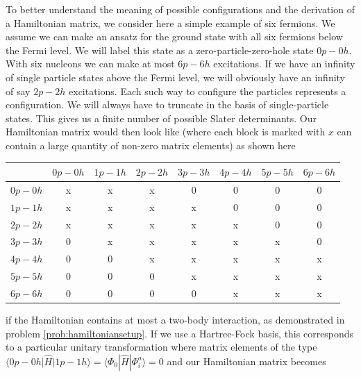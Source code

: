To better understand the meaning of possible configurations and the derivation of a Hamiltonian matrix, we consider here a simple example
of six fermions. We assume we can make an ansatz for the ground state with all six fermions below the Fermi level. We will label this state as a zero-particle-zero-hole state $0p-0h$. With six nucleons we can make 
at most $6p-6h$ excitations. If we have an infinity of single particle states above the Fermi level, we will obviously have an infinity of say $2p-2h$ excitations. Each such way to configure the particles represents  a configuration. We will always have to truncate in the basis of single-particle states.
This gives us a finite number of possible Slater determinants. Our Hamiltonian matrix would then look like (where each block is marked with $x$ can contain a large quantity of non-zero matrix elements) as shown here
\begin{table}
\begin{center}
\begin{tabular}{cccccccc}
\hline
\multicolumn{1}{c}{  } & \multicolumn{1}{c}{ $0p-0h$ } & \multicolumn{1}{c}{ $1p-1h$ } & \multicolumn{1}{c}{ $2p-2h$ } & \multicolumn{1}{c}{ $3p-3h$ } & \multicolumn{1}{c}{ $4p-4h$ } & \multicolumn{1}{c}{ $5p-5h$ } & \multicolumn{1}{c}{ $6p-6h$ } \\
\hline
$0p-0h$ & x       & x       & x       & 0       & 0       & 0       & 0       \\
$1p-1h$ & x       & x       & x       & x       & 0       & 0       & 0       \\
$2p-2h$ & x       & x       & x       & x       & x       & 0       & 0       \\
$3p-3h$ & 0       & x       & x       & x       & x       & x       & 0       \\
$4p-4h$ & 0       & 0       & x       & x       & x       & x       & x       \\
$5p-5h$ & 0       & 0       & 0       & x       & x       & x       & x       \\
$6p-6h$ & 0       & 0       & 0       & 0       & x       & x       & x       \\
\hline
\end{tabular}
\end{center}
\end{table}
if the Hamiltonian contains at most a two-body interaction, as demonstrated in problem \ref{prob:hamiltoniansetup}.
If we use a Hartree-Fock basis, this corresponds to a particular unitary transformation where matrix elements of the type $\langle 0p-0h \vert \hat{H} \vert 1p-1h\rangle =\langle \Phi_0 | \hat{H}|\Phi_{i}^{a}\rangle=0$ and our Hamiltonian matrix becomes 
